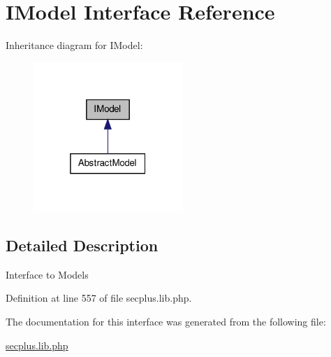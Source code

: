 \hypertarget{interface_sec_plus_1_1_i_model}{
\section{IModel Interface Reference}
\label{interface_sec_plus_1_1_i_model}
}


Inheritance diagram for IModel:\nopagebreak
\begin{figure}[H]
\begin{center}
\leavevmode
\includegraphics[width=160pt]{interface_sec_plus_1_1_i_model__inherit__graph}
\end{center}
\end{figure}


\subsection{Detailed Description}
Interface to Models 

Definition at line 557 of file secplus.lib.php.



The documentation for this interface was generated from the following file:\begin{DoxyCompactItemize}
\item 
\hyperlink{secplus_8lib_8php}{secplus.lib.php}\end{DoxyCompactItemize}
